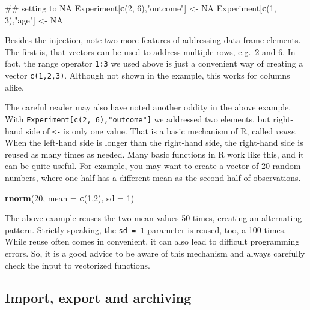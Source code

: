 \documentclass[]{svmono}
\newenvironment{Shaded}{\begin{snugshade}}{\end{snugshade}}
\newcommand{\KeywordTok}[1]{\textcolor[rgb]{0.13,0.29,0.53}{\textbf{#1}}}
\newcommand{\DataTypeTok}[1]{\textcolor[rgb]{0.13,0.29,0.53}{#1}}
\newcommand{\DecValTok}[1]{\textcolor[rgb]{0.00,0.00,0.81}{#1}}
\newcommand{\StringTok}[1]{\textcolor[rgb]{0.31,0.60,0.02}{#1}}
\newcommand{\OtherTok}[1]{\textcolor[rgb]{0.56,0.35,0.01}{#1}}
\newcommand{\NormalTok}[1]{#1}
\theoremstyle{definition}
\theoremstyle{definition}
\theoremstyle{definition}
\theoremstyle{remark}
\begin{document}
\begin{Shaded}
\begin{Highlighting}[]
\NormalTok{## setting to NA}
\NormalTok{Experiment[}\KeywordTok{c}\NormalTok{(}\DecValTok{2}\NormalTok{, }\DecValTok{6}\NormalTok{),}\StringTok{"outcome"}\NormalTok{] <-}\StringTok{ }\OtherTok{NA}
\NormalTok{Experiment[}\KeywordTok{c}\NormalTok{(}\DecValTok{1}\NormalTok{, }\DecValTok{3}\NormalTok{),}\StringTok{"age"}\NormalTok{]     <-}\StringTok{ }\OtherTok{NA}
\end{Highlighting}
\end{Shaded}

Besides the injection, note two more features of addressing data frame
elements. The first is, that vectors can be used to address multiple
rows, e.g.~2 and 6. In fact, the range operator \texttt{1:3} we used
above is just a convenient way of creating a vector \texttt{c(1,2,3)}.
Although not shown in the example, this works for columns alike.

The careful reader may also have noted another oddity in the above
example. With \texttt{Experiment{[}c(2,\ 6),"outcome"{]}} we addressed
two elements, but right-hand side of \texttt{\textless{}-} is only one
value. That is a basic mechanism of R, called \emph{reuse}. When the
left-hand side is longer than the right-hand side, the right-hand side
is reused as many times as needed. Many basic functions in R work like
this, and it can be quite useful. For example, you may want to create a
vector of 20 random numbers, where one half has a different mean as the
second half of observations.

\begin{Shaded}
\begin{Highlighting}[]
\KeywordTok{rnorm}\NormalTok{(}\DecValTok{20}\NormalTok{, }\DataTypeTok{mean =} \KeywordTok{c}\NormalTok{(}\DecValTok{1}\NormalTok{,}\DecValTok{2}\NormalTok{), }\DataTypeTok{sd =} \DecValTok{1}\NormalTok{)}
\end{Highlighting}
\end{Shaded}

The above example reuses the two mean values 50 times, creating an
alternating pattern. Strictly speaking, the \texttt{sd\ =\ 1} parameter
is reused, too, a 100 times. While reuse often comes in convenient, it
can also lead to difficult programming errors. So, it is a good advice
to be aware of this mechanism and always carefully check the input to
vectorized functions.

\subsection{Import, export and
archiving}\label{import-export-and-archiving}
\end{document}
